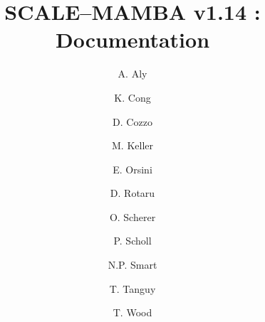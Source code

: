 \documentclass{article}
\begin{document}
\newcommand{\mainsection}[1]{\newpage \section{#1}}
\newcommand{\msubsection}[1]{\newpage \subsection{#1}}
\newcommand{\msubsubsection}[1]{\subsubsection{#1}}

\title{SCALE--MAMBA v1.14 : Documentation}
\author{
A. Aly
\and K. Cong
\and D. Cozzo
\and M. Keller 
\and E. Orsini
\and D. Rotaru 
\and O. Scherer
\and P. Scholl 
\and N.P. Smart
\and T. Tanguy
\and T. Wood}

\maketitle

\tableofcontents































\end{document}
